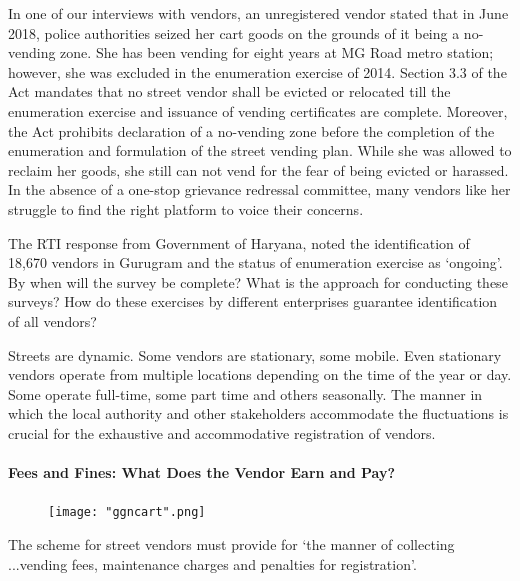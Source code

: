 \documentclass[a4paper, 12pt, twoside]{article}
\begin{document}
{{\begin{mdframed}[backgroundcolor=gray!20]
In one of our interviews with vendors, an unregistered vendor stated that in June 2018, police authorities seized her cart goods on the grounds of it being a no-vending zone. She has been vending for eight years at MG Road metro station; however, she was excluded in the enumeration exercise of 2014. Section 3.3 of the Act mandates that no street vendor shall be evicted or relocated till the enumeration exercise and issuance of vending certificates are complete. Moreover, the Act prohibits declaration of a no-vending zone before the completion of the enumeration and formulation of the street vending plan. While she was allowed to reclaim her goods, she still can not vend for the fear of being evicted or harassed. In the absence of a one-stop grievance redressal committee, many vendors like her struggle to find the right platform to voice their concerns.
\end{mdframed}

The RTI response from Government of Haryana, noted the identification of 18,670 vendors in Gurugram and the status of enumeration exercise as ‘ongoing’. By when will the survey be complete? What is the approach for conducting these surveys? How do these exercises by different enterprises guarantee identification of all vendors?

Streets are dynamic. Some vendors are stationary, some mobile. Even stationary vendors operate from multiple locations depending on the time of the year or day. Some operate full-time, some part time and others seasonally. The manner in which the local authority and other stakeholders accommodate the fluctuations is crucial for the exhaustive and accommodative registration of vendors.

\paragraph*{Fees and Fines: What Does the Vendor Earn and Pay?}


\begin{figure}
\vspace{0pt}

\centering
\texttt{[image: "ggncart".png]}

\end{figure}

The scheme for street vendors must provide for `the manner of collecting ...vending fees, maintenance charges and penalties for registration'.

}}
\end{document}
